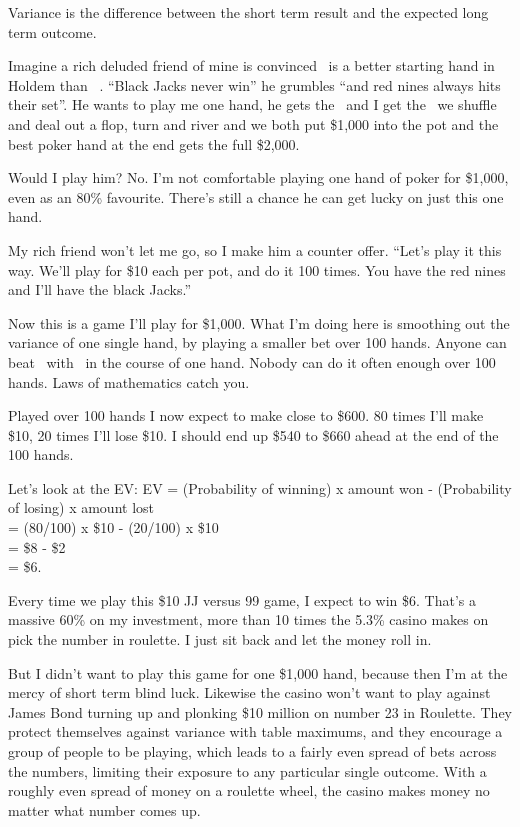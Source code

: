 Variance is the difference between the short term result and the
expected long term outcome.

Imagine a rich deluded friend of mine is convinced \nineh\nined\ is a better
starting hand in Holdem than \Jc\Js\ . ``Black Jacks never win'' he grumbles
``and red nines always hits their set''. He wants to play me one hand, he
gets the \nineh\nined\ and I get the \Jc\Js\, we shuffle and deal out a flop,
turn and river and we both put \$1,000 into the pot and the best
poker hand at the end gets the full \$2,000.

Would I play him? No. I'm not comfortable playing one hand of poker
for \$1,000, even as an 80\% favourite. There's still a chance he can get
lucky on just this one hand.

My rich friend won't let me go, so I make him a counter offer.
``Let's play it this way. We'll play for \$10 each per pot, and do
it 100 times. You have the red nines and I'll have the black Jacks.''

Now this is a game I'll play for \$1,000. What I'm doing here is smoothing
out the variance of one single hand, by playing a smaller bet over
100 hands. Anyone can beat \Jc\Js\ with \nineh\nined\ in the course of one
hand. Nobody can do it often enough over 100 hands. Laws of mathematics
catch you.

Played over 100 hands I now expect to make close to \$600. 80 times I'll
make \$10, 20 times I'll lose \$10. I should end up \$540 to \$660 ahead
at the end of the 100 hands.

Let's look at the EV:
EV = (Probability of winning) x amount won - (Probability of losing) x
amount lost \\
   = (80/100) x \$10 - (20/100) x \$10 \\
   = \$8 - \$2 \\
   = \$6.

Every time we play this \$10 JJ versus 99 game, I expect to win \$6. That's a
massive 60\% on my investment, more than 10 times the 5.3\% casino makes on
pick the number in roulette. I just sit back and let the money roll in.

But I didn't want to play this game for one \$1,000 hand, because then
I'm at the mercy of short term blind luck. Likewise the casino won't
want to play against James Bond turning up and plonking \$10 million
on number 23 in Roulette. They protect themselves against variance
with table maximums, and they encourage a group of people to be playing,
which leads to a fairly even spread of bets across the numbers, limiting
their exposure to any particular single outcome. With a roughly even spread
of money on a roulette wheel, the casino makes money no matter what
number comes up.

